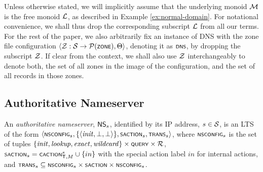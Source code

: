Unless otherwise stated, we will implicitly assume that the underlying monoid $\monoid$ is the free monoid $\cal L$, as described in Example \ref{ex:normal-domain}. For notational convenience, we shall thus drop the corresponding subscript $\cal L$ from all our terms.  
For the rest of the paper, we also arbitrarily fix an instance of DNS with the zone file configuration $\tup{\cal Z : \cal S \rightarrow \cal P(\scrsf{zone}),\Theta}$, denoting it as $\scrsf{dns}$, by dropping the subscript $\cal Z$. If clear from the context, we shall also use $\cal Z$ interchangeably to denote both, the set of all zones in the image of the configuration, and the set of all records in those zones.

\subsection{\label{subsec:NS-semantics}Authoritative Nameserver}

An \emph{authoritative nameserver}, $\ns{s}$, identified by its IP address, $s \in \cal S$, is an LTS of the form $\tup{\scrsf{nsconfig}_s,\{\tup{\mathit{init},\bot,\bot}\},\scrsf{saction}_s,\trans_s}$, where $\scrsf{nsconfig}_s$ is the set of tuples $\{\mathit{init},\mathit{lookup},\mathit{exact},\mathit{wildcard}\}\times \scrsf{query} \times \cal R$, $\scrsf{saction}_s = \scrsf{caction}^s_{\mathsf T,M} \cup \{in\}$ with the special action label $in$ for internal actions, and $\trans_s \subseteq \scrsf{nsconfig}_s \times \scrsf{saction} \times \scrsf{nsconfig}_s$. 

